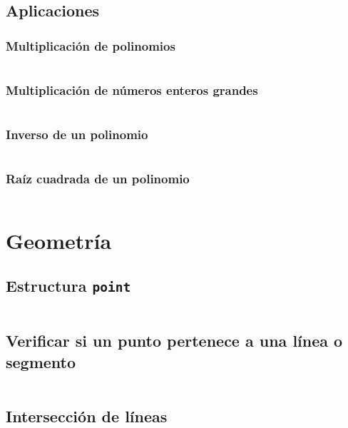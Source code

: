 \documentclass[11pt]{article}
\begin{document}
		\subsection{Aplicaciones}
			\subsubsection{Multiplicación de polinomios}
			\inputminted[tabsize=2,breaklines,firstline=92,lastline=118,fontsize=\small]{c++}{fft.cpp}
			
			\subsubsection{Multiplicación de números enteros grandes}
			\inputminted[tabsize=2,breaklines,firstline=120,lastline=156,fontsize=\small]{c++}{fft.cpp}
			
			\subsubsection{Inverso de un polinomio}
			\inputminted[tabsize=2,breaklines,firstline=158,lastline=184,fontsize=\small]{c++}{fft.cpp}
			
			\subsubsection{Raíz cuadrada de un polinomio}
			\inputminted[tabsize=2,breaklines,firstline=186,lastline=208,fontsize=\small]{c++}{fft.cpp}
			
	\newpage
	\section{Geometría}
		\subsection{Estructura \texttt{point}}
		\inputminted[tabsize=2,breaklines,firstline=4,lastline=100,fontsize=\small]{c++}{geometry.cpp}

		\subsection{Verificar si un punto pertenece a una línea o segmento}
		\inputminted[tabsize=2,breaklines,firstline=102,lastline=111,fontsize=\small]{c++}{geometry.cpp}
		
		\subsection{Intersección de líneas}
		\inputminted[tabsize=2,breaklines,firstline=113,lastline=133,fontsize=\small]{c++}{geometry.cpp}
		
\end{document}
